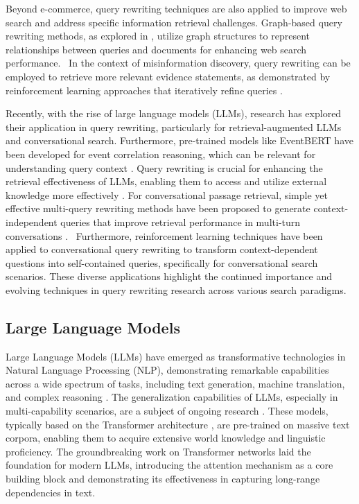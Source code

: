 Beyond e-commerce, query rewriting techniques are also applied to improve web search and address specific information retrieval challenges. Graph-based query rewriting methods, as explored in \cite{GraphBasedQR2007}, utilize graph structures to represent relationships between queries and documents for enhancing web search performance.  In the context of misinformation discovery, query rewriting can be employed to retrieve more relevant evidence statements, as demonstrated by reinforcement learning approaches that iteratively refine queries \cite{MisinfoQR2023}.

Recently, with the rise of large language models (LLMs), research has explored their application in query rewriting, particularly for retrieval-augmented LLMs and conversational search.  Furthermore, pre-trained models like EventBERT have been developed for event correlation reasoning, which can be relevant for understanding query context \cite{zhou2022eventbert}. Query rewriting is crucial for enhancing the retrieval effectiveness of LLMs, enabling them to access and utilize external knowledge more effectively \cite{QRforLLM2023, QRinLLMOpenReview}.  For conversational passage retrieval, simple yet effective multi-query rewriting methods have been proposed to generate context-independent queries that improve retrieval performance in multi-turn conversations \cite{SimpleMultiQR2024}.  Furthermore, reinforcement learning techniques have been applied to conversational query rewriting to transform context-dependent questions into self-contained queries, specifically for conversational search scenarios. These diverse applications highlight the continued importance and evolving techniques in query rewriting research across various search paradigms.

\subsection{Large Language Models}

Large Language Models (LLMs) have emerged as transformative technologies in Natural Language Processing (NLP), demonstrating remarkable capabilities across a wide spectrum of tasks, including text generation, machine translation, and complex reasoning \cite{LLMSurvey2024}.  The generalization capabilities of LLMs, especially in multi-capability scenarios, are a subject of ongoing research \cite{zhou2025weak}. These models, typically based on the Transformer architecture \cite{AttentionIsAllYouNeed2017}, are pre-trained on massive text corpora, enabling them to acquire extensive world knowledge and linguistic proficiency.  The groundbreaking work on Transformer networks \cite{AttentionIsAllYouNeed2017} laid the foundation for modern LLMs, introducing the attention mechanism as a core building block and demonstrating its effectiveness in capturing long-range dependencies in text.


